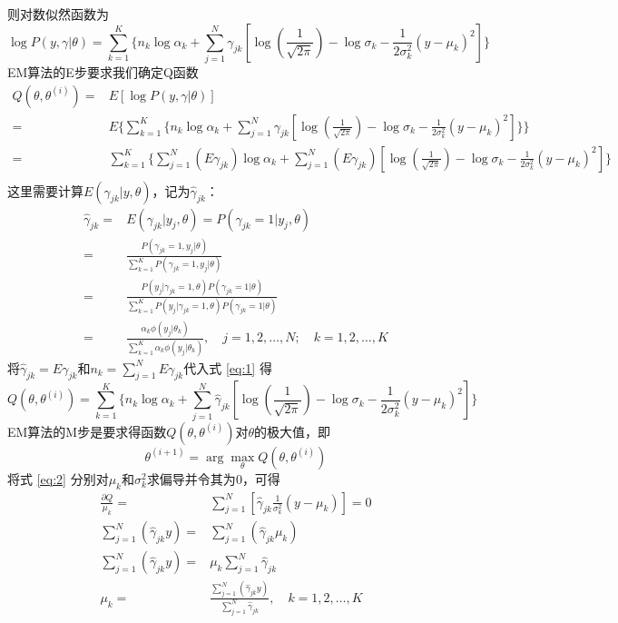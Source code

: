 \documentclass[lang=cn,11pt,a4paper,cite=authoryear]{elegantpaper}
\begin{document}
则对数似然函数为
\begin{equation}
\log P(y,\gamma|\theta)=\sum_{k=1}^K\{n_k\log \alpha_k+\sum_{j=1}^N\gamma_{jk}[\log(\frac{1}{\sqrt{2\pi}})-\log\sigma_k-\frac{1}{2\sigma_k^2}(y-\mu_k)^2]\}
\end{equation}
EM算法的E步要求我们确定Q函数
\begin{equation}
\begin{aligned}
	Q(\theta,\theta^{(i)})=&E[\log P(y,\gamma|\theta)]\\
	=&E\{\sum_{k=1}^K\{n_k\log \alpha_k+\sum_{j=1}^N\gamma_{jk}[\log(\frac{1}{\sqrt{2\pi}})-\log\sigma_k-\frac{1}{2\sigma_k^2}(y-\mu_k)^2]\}\}\\
	=&\sum_{k=1}^K\{\sum\limits_{j=1}^N(E\gamma_{jk})\log \alpha_k+\sum_{j=1}^N(E\gamma_{jk})[\log(\frac{1}{\sqrt{2\pi}})-\log\sigma_k-\frac{1}{2\sigma_k^2}(y-\mu_k)^2]\}\\
\end{aligned}
\end{equation}
这里需要计算$E(\gamma_{jk}|y,\theta)$，记为$\hat{\gamma}_{jk}$：
\begin{equation}
\begin{aligned}
	\hat{\gamma}_{jk}=&E(\gamma_{jk}|y_j,\theta)=P(\gamma_{jk}=1|y_j,\theta)\\
	=&\frac{P(\gamma_{jk}=1,y_j|\theta)}{\sum\limits_{k=1}^KP(\gamma_{jk}=1,y_j|\theta)}\\
	=&\frac{P(y_j|\gamma_{jk}=1,\theta)P(\gamma_{jk}=1|\theta)}{\sum\limits_{k=1}^KP(y_j|\gamma_{jk}=1,\theta)P(\gamma_{jk}=1|\theta)}\\
	=&\frac{\alpha_k\phi(y_j|\theta_k)}{\sum\limits_{k=1}^K\alpha_k\phi(y_j|\theta_k)}, \quad j=1,2,\dots,N; \quad k=1,2,\dots,K
\end{aligned}
\label{eq:1}
\end{equation}
将$\hat{\gamma}_{jk}=E\gamma_{jk}$和$n_k=\sum\limits_{j=1}^NE\gamma_{jk}$代入式 \ref{eq:1} 得
\begin{equation}
Q(\theta,\theta^{(i)})=\sum_{k=1}^K\{n_k\log \alpha_k+\sum_{j=1}^N\hat{\gamma}_{jk}[\log(\frac{1}{\sqrt{2\pi}})-\log\sigma_k-\frac{1}{2\sigma_k^2}(y-\mu_k)^2]\}
\label{eq:2}
\end{equation}
EM算法的M步是要求得函数$Q(\theta,\theta^{(i)})$对$\theta$的极大值，即
\begin{equation}
\theta^{(i+1)}=\arg\max_\theta Q(\theta,\theta^{(i)})
\end{equation}
将式 \ref{eq:2} 分别对$\mu_k$和$\sigma_k^2$求偏导并令其为$0$，可得
\begin{equation}
\begin{aligned}
	\frac{\partial Q}{\mu_k} =& \sum_{j=1}^N[\hat{\gamma}_{jk}\frac{1}{\sigma^2_k}(y-\mu_k)]=0\\
	\sum_{j=1}^N(\hat{\gamma}_{jk}y)=&\sum_{j=1}^N(\hat{\gamma}_{jk}\mu_k)\\
	\sum_{j=1}^N(\hat{\gamma}_{jk}y)=&\mu_k\sum_{j=1}^N\hat{\gamma}_{jk}\\
	\mu_k=&\frac{\sum_{j=1}^N(\hat{\gamma}_{jk}y)}{\sum_{j=1}^N\hat{\gamma}_{jk}}, \quad k=1,2,\dots,K
\end{aligned}
\end{equation}
\end{document}
